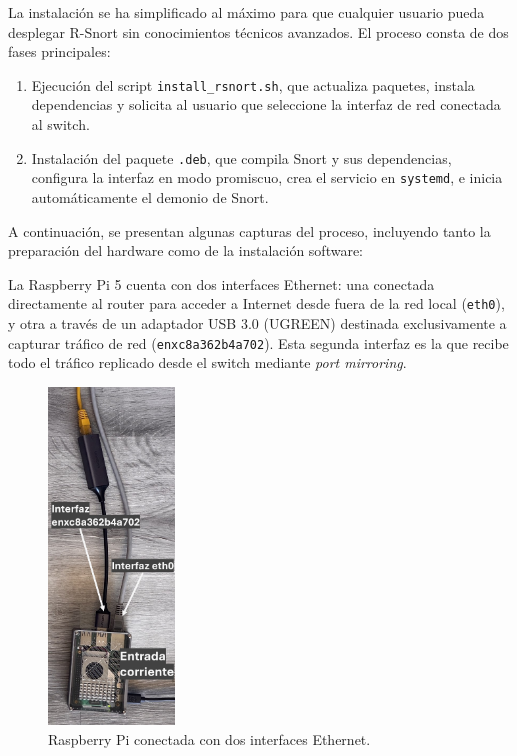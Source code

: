 \documentclass[11pt,a4paper,twoside]{report}
\begin{document}
La instalación se ha simplificado al máximo para que cualquier usuario pueda desplegar R-Snort sin conocimientos técnicos avanzados. El proceso consta de dos fases principales:

\begin{enumerate}
	\item Ejecución del script \texttt{install\_rsnort.sh}, que actualiza paquetes, instala dependencias y solicita al usuario que seleccione la interfaz de red conectada al switch.
	\item Instalación del paquete \texttt{.deb}, que compila Snort y sus dependencias, configura la interfaz en modo promiscuo, crea el servicio en \texttt{systemd}, e inicia automáticamente el demonio de Snort.
\end{enumerate}

A continuación, se presentan algunas capturas del proceso, incluyendo tanto la preparación del hardware como de la instalación software:\newline

La Raspberry Pi 5 cuenta con dos interfaces Ethernet: una conectada directamente al router para acceder a Internet desde fuera de la red local (\texttt{eth0}), y otra a través de un adaptador USB 3.0 (UGREEN) destinada exclusivamente a capturar tráfico de red (\texttt{enxc8a362b4a702}). Esta segunda interfaz es la que recibe todo el tráfico replicado desde el switch mediante \textit{port mirroring}.

\begin{figure}[H]
	\centering
	\includegraphics[width=0.3\textwidth]{pruebas_config/1-1.JPG}
	\caption{Raspberry Pi conectada con dos interfaces Ethernet.}
\end{figure}
\end{document}
